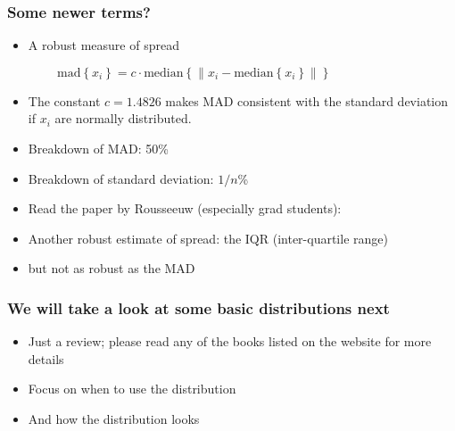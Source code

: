 \begin{frame}\frametitle{Some newer terms?}
	{}
	\begin{itemize}
		\item	A robust measure of spread
	\end{itemize}
	$ \qquad\qquad \text{mad}\left\{ x_i \right\} = c \cdot \text{median}\left\{ \| x_i - \text{median}\left\{ x_i \right\} \| \right\} $
	\begin{itemize}
		\item	The constant $c = 1.4826$ makes MAD consistent with the standard deviation if $x_i$ are normally distributed.
		\item	Breakdown of MAD: 50\%
		\item	Breakdown of standard deviation: $1/n$\%
	\end{itemize}
	\begin{itemize}
		\item	Read the paper by Rousseeuw (especially grad students):
		\iftoggle{hrymak}{
			\begin{itemize}
				\item	\href{http://literature.connectmv.com/item/173}{http://literature.connectmv.com/item/173}
			\end{itemize}
		}{
			\begin{itemize}
				\item	\href{http://learnche.mcmaster.ca/media/mcmaster/Rousseeuw-tutorial.pdf}{http://learnche.mcmaster.ca/media/mcmaster/Rousseeuw-tutorial.pdf}
			\end{itemize}
		}
	\end{itemize}
	\begin{itemize}
		\item	Another robust estimate of spread: the IQR (inter-quartile range)
		\item	but not as robust as the MAD
	\end{itemize}
\end{frame}

\begin{frame}\frametitle{We will take a look at some basic distributions next}
	\begin{itemize}
		\item	Just a review; please read any of the books listed on the website for more details
		\item	Focus on when to use the distribution
		\item	And how the distribution looks
	\end{itemize}
\end{frame}

